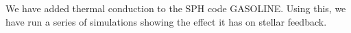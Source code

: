 \documentclass{report}
\begin{document}
\fontsize{30pt}{1em}\selectfont
\color{white}
We have added thermal conduction to the SPH code GASOLINE.  Using this, we
have run a series of simulations showing the effect it has on stellar feedback.
\end{document}
